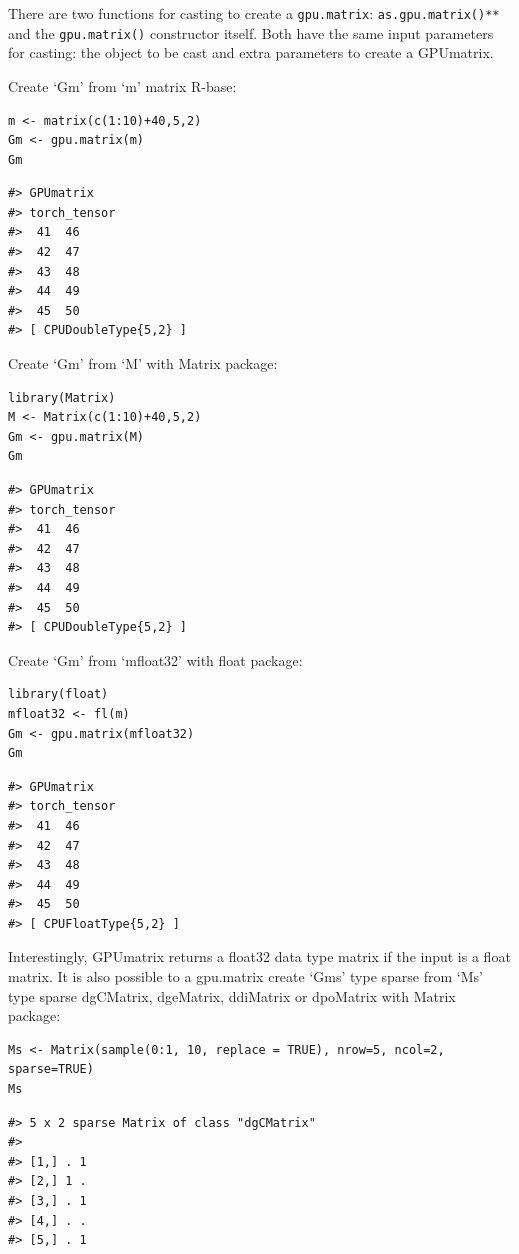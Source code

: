 There are two functions for casting to create a \texttt{gpu.matrix}: \texttt{as.gpu.matrix()**} and the \texttt{gpu.matrix()} constructor itself. Both have the same input parameters for casting: the object to be cast and extra parameters to create a GPUmatrix.

Create `Gm' from `m' matrix R-base:

\begin{verbatim}
m <- matrix(c(1:10)+40,5,2)
Gm <- gpu.matrix(m)
Gm
\end{verbatim}

\begin{verbatim}
#> GPUmatrix
#> torch_tensor
#>  41  46
#>  42  47
#>  43  48
#>  44  49
#>  45  50
#> [ CPUDoubleType{5,2} ]
\end{verbatim}

Create `Gm' from `M' with Matrix package:

\begin{verbatim}
library(Matrix)
M <- Matrix(c(1:10)+40,5,2)
Gm <- gpu.matrix(M)
Gm
\end{verbatim}

\begin{verbatim}
#> GPUmatrix
#> torch_tensor
#>  41  46
#>  42  47
#>  43  48
#>  44  49
#>  45  50
#> [ CPUDoubleType{5,2} ]
\end{verbatim}

Create `Gm' from `mfloat32' with float package:

\begin{verbatim}
library(float)
mfloat32 <- fl(m)
Gm <- gpu.matrix(mfloat32)
Gm
\end{verbatim}

\begin{verbatim}
#> GPUmatrix
#> torch_tensor
#>  41  46
#>  42  47
#>  43  48
#>  44  49
#>  45  50
#> [ CPUFloatType{5,2} ]
\end{verbatim}

Interestingly, GPUmatrix returns a float32 data type matrix if the input is a float matrix. It is also possible to a gpu.matrix create `Gms' type sparse from `Ms' type sparse dgCMatrix, dgeMatrix, ddiMatrix or dpoMatrix with Matrix package:

\begin{verbatim}
Ms <- Matrix(sample(0:1, 10, replace = TRUE), nrow=5, ncol=2, sparse=TRUE)
Ms
\end{verbatim}

\begin{verbatim}
#> 5 x 2 sparse Matrix of class "dgCMatrix"
#>         
#> [1,] . 1
#> [2,] 1 .
#> [3,] . 1
#> [4,] . .
#> [5,] . 1
\end{verbatim}

